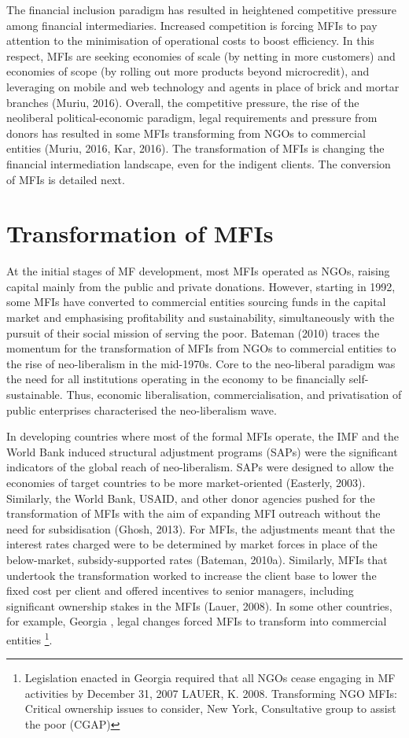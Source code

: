 \documentclass[a4paper, nobind]{templates/ociamthesis}
\begin{document}
The financial inclusion paradigm has resulted in heightened competitive pressure among financial intermediaries. Increased competition is forcing MFIs to pay attention to the minimisation of operational costs to boost efficiency. In this respect, MFIs are seeking economies of scale (by netting in more customers) and economies of scope (by rolling out more products beyond microcredit), and leveraging on mobile and web technology and agents in place of brick and mortar branches (Muriu, 2016). Overall, the competitive pressure, the rise of the neoliberal political-economic paradigm, legal requirements and pressure from donors has resulted in some MFIs transforming from NGOs to commercial entities (Muriu, 2016, Kar, 2016). The transformation of MFIs is changing the financial intermediation landscape, even for the indigent clients. The conversion of MFIs is detailed next.

\hypertarget{transformation-of-mfis}{%
\section{Transformation of MFIs}\label{transformation-of-mfis}}

\noindent At the initial stages of MF development, most MFIs operated as NGOs, raising capital mainly from the public and private donations. However, starting in 1992, some MFIs have converted to commercial entities sourcing funds in the capital market and emphasising profitability and sustainability, simultaneously with the pursuit of their social mission of serving the poor. Bateman (2010) traces the momentum for the transformation of MFIs from NGOs to commercial entities to the rise of neo-liberalism in the mid-1970s. Core to the neo-liberal paradigm was the need for all institutions operating in the economy to be financially self-sustainable. Thus, economic liberalisation, commercialisation, and privatisation of public enterprises characterised the neo-liberalism wave.

In developing countries where most of the formal MFIs operate, the IMF and the World Bank induced structural adjustment programs (SAPs) were the significant indicators of the global reach of neo-liberalism. SAPs were designed to allow the economies of target countries to be more market-oriented (Easterly, 2003). Similarly, the World Bank, USAID, and other donor agencies pushed for the transformation of MFIs with the aim of expanding MFI outreach without the need for subsidisation (Ghosh, 2013). For MFIs, the adjustments meant that the interest rates charged were to be determined by market forces in place of the below-market, subsidy-supported rates (Bateman, 2010a). Similarly, MFIs that undertook the transformation worked to increase the client base to lower the fixed cost per client and offered incentives to senior managers, including significant ownership stakes in the MFIs (Lauer, 2008). In some other countries, for example, Georgia , legal changes forced MFIs to transform into commercial entities \footnote{Legislation enacted in Georgia required that all NGOs cease engaging in MF activities by December 31, 2007 LAUER, K. 2008. Transforming NGO MFIs: Critical ownership issues to consider, New York, Consultative group to assist the poor (CGAP)}.
\end{document}
